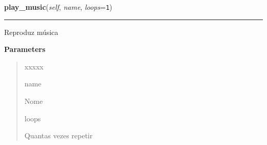 \hspace{.8\funcindent}\begin{boxedminipage}{\funcwidth}

    \raggedright \textbf{play\_music}(\textit{self}, \textit{name}, \textit{loops}={\tt 1})

    \vspace{-1.5ex}

    \rule{\textwidth}{0.5\fboxrule}
\setlength{\parskip}{2ex}
    Reproduz música

\setlength{\parskip}{1ex}
      \textbf{Parameters}
      \vspace{-1ex}

      \begin{quote}
        \begin{Ventry}{xxxxx}

          \item[name]

          Nome

          \item[loops]

          Quantas vezes repetir

        \end{Ventry}

      \end{quote}

    \end{boxedminipage}

    \label{pygame-asteroids:resource_manager:ResourceManager:play_sound}

    \vspace{0.5ex}


